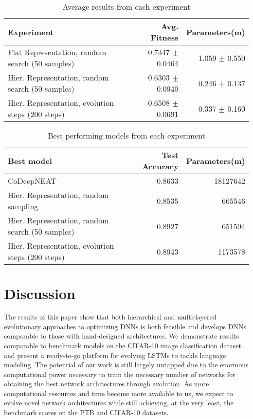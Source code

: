 \documentclass[11pt]{article}
\begin{document}
\begin{table}[h]
\begin{center}
\begin{tabular}{|l|r|r|} \hline
{\bf Experiment} & {\bf Avg. Fitness} & {\bf Parameters(m)}\\ \hline
Flat Representation, random search (50 samples) & 0.7347 $\pm$ 0.0464 & 1.059 $\pm$ 0.550 \\ \hline
Hier. Representation, random search (50 samples) & 0.6303 $\pm$ 0.0940 & 0.246 $\pm$ 0.137 \\
Hier. Representation, evolution steps (200 steps) & 0.6508 $\pm$ 0.0691 & 0.337 $\pm$ 0.160 \\
\end{tabular}
\caption{Average results from each experiment}
\label{table:results_avg}
\end{center}
\end{table}

\begin{table}[h]
\begin{center}
\begin{tabular}{|l|r|r|} \hline
{\bf Best model} & {\bf Test Accuracy} & {\bf Parameters(m)} \\ \hline
CoDeepNEAT & 0.8633 & 18127642 \\
Hier. Representation, random sampling & 0.8535 & 665546 \\
Hier. Representation, random search (50 samples) & 0.8927 & 651594 \\
Hier. Representation, evolution steps (200 steps) & 0.8943 & 1173578 \\ \hline
\end{tabular}
\caption{Best performing models from each experiment}
\label{table:results_best}
\end{center}
\end{table}


\section{Discussion}
The results of this paper show that both hierarchical and multi-layered evolutionary approaches to optimizing DNNs is both feasible and develops DNNs comparable to those with hand-designed architectures. We demonstrate results comparable to benchmark models on the CIFAR-10 image classification dataset and present a ready-to-go platform for evolving LSTMs to tackle language modeling. The potential of our work is still largely untapped due to the enormous computational power necessary to train the necessary number of networks for obtaining the best network architectures through evolution. As more computational resources and time become more available to us, we expect to evolve novel network architectures while still achieving, at the very least, the benchmark scores on the PTB and CIFAR-10 datasets.
\end{document}
